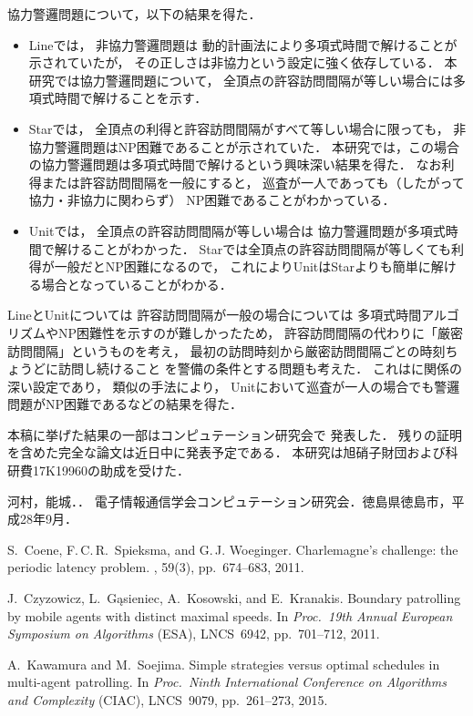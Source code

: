 \documentclass{jss}
\begin{document}
協力警邏問題について，以下の結果を得た．
\begin{itemize}
\item 
Lineでは，
非協力警邏問題は
動的計画法により多項式時間で解けることが
示されていた\cite[Theorem~11]{coene2011charlemagne}が，
その正しさは非協力という設定に強く依存している．
本研究では協力警邏問題について，
全頂点の許容訪問間隔が等しい場合には多項式時間で解けることを示す．
\item
Starでは，
全頂点の利得と許容訪問間隔がすべて等しい場合に限っても，
非協力警邏問題はNP困難であることが示されていた\cite[Theorem~10]{coene2011charlemagne}．
本研究では，この場合の協力警邏問題は多項式時間で解けるという興味深い結果を得た．
なお利得または許容訪問間隔を一般にすると，
巡査が一人であっても（したがって協力・非協力に関わらず）
NP困難であることがわかっている\cite[Theorems 5 and 6]{coene2011charlemagne}．
\item 
Unitでは，
全頂点の許容訪問間隔が等しい場合は
協力警邏問題が多項式時間で解けることがわかった．
Starでは全頂点の許容訪問間隔が等しくても利得が一般だとNP困難になるので，
これによりUnitはStarよりも簡単に解ける場合となっていることがわかる．
\end{itemize}

LineとUnitについては
許容訪問間隔が一般の場合については
多項式時間アルゴリズムやNP困難性を示すのが難しかったため，
許容訪問間隔の代わりに「厳密訪問間隔」というものを考え，
最初の訪問時刻から厳密訪問間隔ごとの時刻ちょうどに訪問し続けること
を警備の条件とする問題も考えた．
これは\cite{kawamura2015simple}に関係の深い設定であり，
類似の手法により，
Unitにおいて巡査が一人の場合でも警邏問題がNP困難であるなどの結果を得た．

本稿に挙げた結果の一部はコンピュテーション研究会で
発表した\cite{kenkyukai}．
残りの証明を含めた完全な論文は近日中に発表予定である．
本研究は旭硝子財団および科研費17K19960の助成を受けた．

\begin{thebibliography}{1}

  \small

河村，能城．．
電子情報通信学会コンピュテーション研究会．徳島県徳島市，平成28年9月．

S.~Coene, F.\,C.\,R.~Spieksma, and G.\,J. Woeginger.
\newblock Charlemagne's challenge: the periodic latency problem.
, 59(3), pp.~674--683, 2011.


J.~Czyzowicz, L.~G{\k{a}}sieniec, A.~Kosowski, and E.~Kranakis.
\newblock Boundary patrolling by mobile agents with distinct maximal speeds.
\newblock In {\it Proc.\ 19th Annual European Symposium on Algorithms} (ESA), LNCS~6942, pp.~701--712, 2011. 

A.~Kawamura and M.~Soejima.
\newblock Simple strategies versus optimal schedules in multi-agent patrolling.
\newblock In \emph{Proc.\ Ninth International Conference on Algorithms and Complexity} (CIAC), LNCS~9079, pp.~261--273, 2015.

\end{thebibliography}
\end{document}
